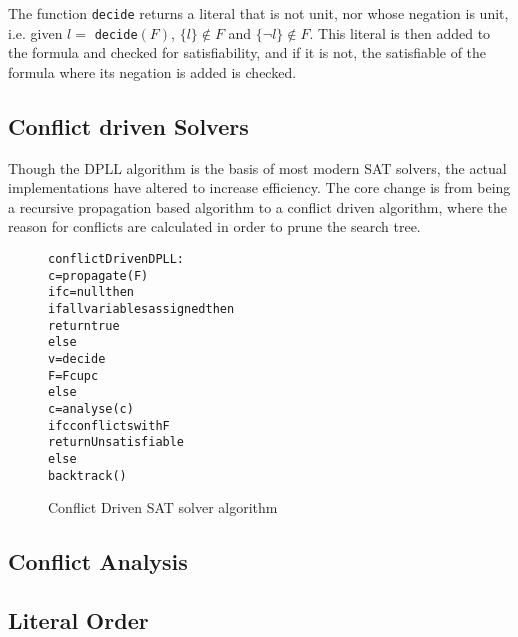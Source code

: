 The function \verb+decide+ returns a literal that is not unit, nor whose negation is unit, i.e. given $l =$ \verb+decide+$(F)$, $\{l\} \not \in F$ and $\{\neg l\} \not \in F$.
This literal is then added to the formula and checked for satisfiability, 
and if it is not, the satisfiable of the formula where its negation is added is checked.  

\subsection{Conflict driven Solvers}
Though the DPLL algorithm is the basis of most modern SAT solvers, the actual implementations have altered to increase efficiency.
The core change is from being a recursive propagation based algorithm to a conflict driven algorithm,
where the reason for conflicts are calculated in order to prune the search tree.

\begin{figure}[htp]
\begin{center}
\begin{alltt}
conflictDrivenDPLL:
	c = propagate(F)
	if c = null then
		if all variables assigned then
			return true
		else
			v = decide
			F = F cup {c}
	else
		c = analyse(c)
		if c conflicts with F
			return Unsatisfiable
		else
			backtrack()
			
\end{alltt}
  \caption{Conflict Driven SAT solver algorithm}
  \label{impl.conflictSAT}
\end{center}
\end{figure}


\subsection{Conflict Analysis}



\subsection{Literal Order}

